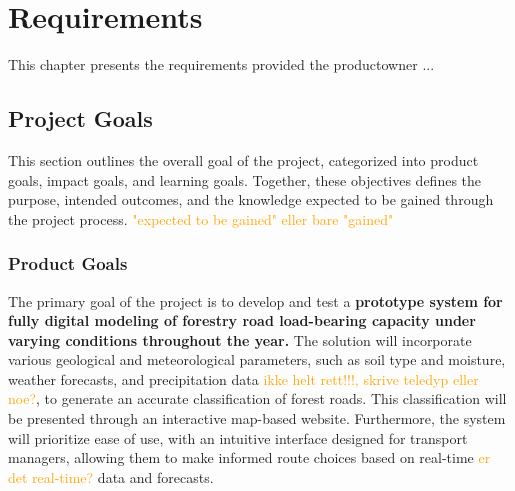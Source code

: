 \chapter{Requirements}\label{chap:requirements}

This chapter presents the requirements provided the \gls{productowner} ...

\section{Project Goals}

This section outlines the overall goal of the project, categorized into product goals, impact goals, and learning goals. Together, these objectives defines the purpose, intended outcomes, and the knowledge expected to be gained through the project process. \textcolor{orange}{"expected to be gained" eller bare "gained"}

\subsection{Product Goals}\label{subsec:req:productgoals}

The primary goal of the project is to develop and test a \textbf{prototype system for fully digital modeling of forestry road load-bearing capacity under varying conditions throughout the year.} The solution will incorporate various geological and meteorological parameters, such as soil type and moisture, weather forecasts, and precipitation data \textcolor{orange}{ikke helt rett!!!, skrive teledyp eller noe?}, to generate an accurate classification of forest roads. This classification will be presented through an interactive map-based website. Furthermore, the system will prioritize ease of use, with an intuitive interface designed for transport managers, allowing them to make informed route choices based on real-time \textcolor{orange}{er det real-time?} data and forecasts. 


